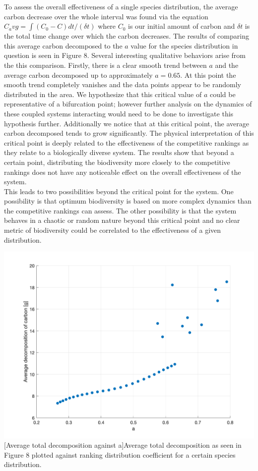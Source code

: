 \documentclass[12pt]{article}
\begin{document}
\begin{multicols}{2}
To assess the overall effectiveness of a single species distribution, the average carbon decrease over the whole interval was found via the equation $C_avg = \int (C_{0}-C)dt/(\delta t)$ where $C_{0}$ is our initial amount of carbon and $\delta t$ is the total time change over which the carbon decreases. The results of comparing this average carbon decomposed to the $a$ value for the species distribution in question is seen in Figure 8. Several interesting qualitative behaviors arise from the this comparison. Firstly, there is a clear smooth trend between $a$ and the average carbon decomposed up to approximately $a=0.65$. At this point the smooth trend completely vanishes and the data points appear to be randomly distributed in the area. We hypothesize that this critical value of $a$ could be representative of a bifurcation point; however further analysis on the dynamics of these coupled systems interacting would need to be done to investigate this hypothesis further. Additionally we notice that at this critical point, the average carbon decomposed tends to grow significantly. The physical interpretation of this critical point is deeply related to the effectiveness of the competitive rankings as they relate to a biologically diverse system. The results show that beyond a certain point, distributing the biodiversity more closely to the competitive rankings does not have any noticeable effect on the overall effectiveness of the system. \\
This leads to two possibilities beyond the critical point for the system. One possibility is that optimum biodiversity is based on more complex dynamics than the competitive rankings can assess. The other possibility is that the system behaves in a chaotic or random nature beyond this critical point and no clear metric of biodiversity could be correlated to the effectiveness of a given distribution.

\end{multicols}
\begin{center}\label{Competitive Distribution Coefficients}
\includegraphics[width=\linewidth]{a-competative-distribution-coef_to_avg_Clost.png}
[Average total decomposition against a]{Average total decomposition as seen in Figure 8 plotted against ranking distribution coefficient for a certain species distribution.}
\end{center}
\end{document}
